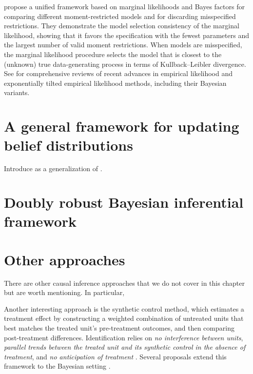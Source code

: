\cite{chib2018moment} propose a unified framework based on marginal likelihoods and Bayes factors for comparing different moment-restricted models and for discarding misspecified restrictions. They demonstrate the model selection consistency of the marginal likelihood, showing that it favors the specification with the fewest parameters and the largest number of valid moment restrictions. When models are misspecified, the marginal likelihood procedure selects the model that is closest to the (unknown) true data-generating process in terms of Kullback–Leibler divergence. See \cite{lazar2021review, liu2023review} for comprehensive reviews of recent advances in empirical likelihood and exponentially tilted empirical likelihood methods, including their Bayesian variants.

\section{A general framework for updating belief distributions}\label{sec12_10}

Introduce \cite{bissiri2016general} as a generalization of \cite{chernozhukov2003mcmc}.


\section{Doubly robust Bayesian inferential framework}\label{sec12_11}
\cite{breunig2025double}

\section{Other approaches}\label{sec12_12}
There are other causal inference approaches that we do not cover in this chapter but are worth mentioning. In particular, 

Another interesting approach is the synthetic control method, which estimates a treatment effect by constructing a weighted combination of untreated units that best matches the treated unit's pre-treatment outcomes, and then comparing post-treatment differences. Identification relies on \textit{no interference between units}, \textit{parallel trends between the treated unit and its synthetic control in the absence of treatment}, and \textit{no anticipation of treatment} \cite{abadie2010synthetic}. Several proposals extend this framework to the Bayesian setting \cite{amjad2018robust,kim2020bayesian,pang2022bayesian}.


